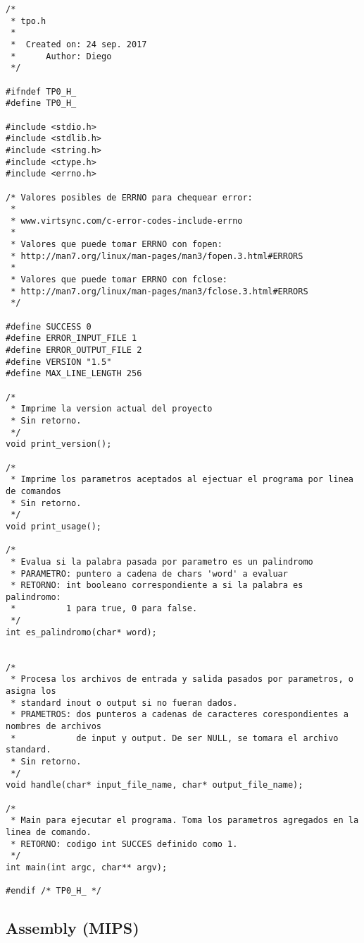 \documentclass[10pt,a4paper]{article}
\begin{document}
\begin{lstlisting}
/*
 * tpo.h
 *
 *  Created on: 24 sep. 2017
 *      Author: Diego
 */

#ifndef TP0_H_
#define TP0_H_

#include <stdio.h>
#include <stdlib.h>
#include <string.h>
#include <ctype.h>
#include <errno.h>

/* Valores posibles de ERRNO para chequear error:
 *
 * www.virtsync.com/c-error-codes-include-errno
 *
 * Valores que puede tomar ERRNO con fopen:
 * http://man7.org/linux/man-pages/man3/fopen.3.html#ERRORS
 *
 * Valores que puede tomar ERRNO con fclose:
 * http://man7.org/linux/man-pages/man3/fclose.3.html#ERRORS
 */

#define SUCCESS 0
#define ERROR_INPUT_FILE 1
#define ERROR_OUTPUT_FILE 2
#define VERSION "1.5"
#define MAX_LINE_LENGTH 256

/*
 * Imprime la version actual del proyecto
 * Sin retorno.
 */
void print_version();

/*
 * Imprime los parametros aceptados al ejectuar el programa por linea de comandos
 * Sin retorno.
 */
void print_usage();

/*
 * Evalua si la palabra pasada por parametro es un palindromo
 * PARAMETRO: puntero a cadena de chars 'word' a evaluar
 * RETORNO: int booleano correspondiente a si la palabra es palindromo:
 * 			1 para true, 0 para false.
 */
int es_palindromo(char* word);


/*
 * Procesa los archivos de entrada y salida pasados por parametros, o asigna los
 * standard inout o output si no fueran dados.
 * PRAMETROS: dos punteros a cadenas de caracteres corespondientes a nombres de archivos
 * 			  de input y output. De ser NULL, se tomara el archivo standard.
 * Sin retorno.
 */
void handle(char* input_file_name, char* output_file_name);

/*
 * Main para ejecutar el programa. Toma los parametros agregados en la linea de comando.
 * RETORNO: codigo int SUCCES definido como 1.
 */
int main(int argc, char** argv);

#endif /* TP0_H_ */
\end{lstlisting}

\newpage



\newpage

\subsection{Assembly (MIPS)}
\end{document}
